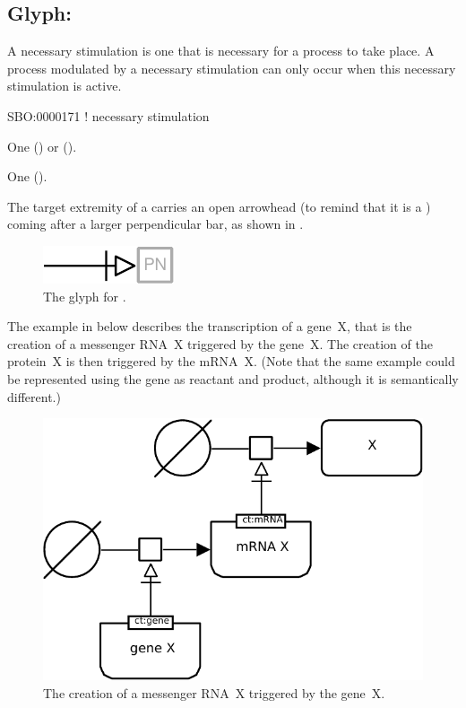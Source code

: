 \subsection{Glyph: }
\label{sec:necessary_stim}

A necessary stimulation is one that is necessary for a process to take place. A process modulated by a necessary stimulation can only occur when this necessary stimulation is active.

\begin{glyphDescription}

\glyphSboTerm
SBO:0000171 ! necessary stimulation

\glyphOrigin
One  () or  ().

\glyphTarget
One  ().

\glyphSymbol
The target extremity of a  carries an open arrowhead (to remind that it is a ) coming after a larger perpendicular bar, as shown in .

\end{glyphDescription}

\begin{figure}[H]
  \centering
  \includegraphics{images/build/necessary_stim.pdf}
  \caption{The \PD glyph for .}
  \label{fig:Necessary Stimulation}
\end{figure}

The example in  below describes the transcription of a gene~X, that is the creation of a messenger RNA~X triggered by the gene~X.  The creation of the protein~X is then triggered by the mRNA~X.  (Note that the same example could be represented using the gene as reactant and product, although it is semantically different.)

\begin{figure}[H]
  \centering
  \includegraphics[scale = 0.8]{images/build/necessary_stim_genetic_example.pdf}
  \caption{The creation of a messenger RNA~X triggered by the gene~X.}
  \label{fig:necessary_stim-gene}
\end{figure}

